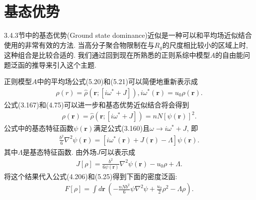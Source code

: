     \section{基态优势}
    3.4.3节中的基态优势(Ground state dominance)近似是一种可以和平均场近似结合使用的非常有效的方法.
    当高分子聚合物限制在与$R_{g}$的尺度相比较小的区域上时,
    这种组合是比较合适的.
    我们通过回到现在所熟悉的正则系综中模型$A$的自由能问题泛函的推导来引入这个主题.
    \par
    正则模型$A$中的平均场公式(5.20)和(5.21)可以简便地重新表示成
    \label{subsec.equations}
    \begin{equation}
        \begin{aligned}
        \rho(r)=\hat{\rho}(\bm{r};[i\omega^{*}+J]),
            i\omega^{*}(\bm{r})=u_{0}\rho(\bm{r}). 
                   \end{aligned}
        \label{eq5.51}
    \end{equation}
    公式(3.167)和(4.75)可以进一步和基态优势近似结合将会得到
    \label{subsec.equations}
    \begin{equation}
        \begin{aligned}
            \rho(\bm{r})=\hat{\rho}(\bm{r};[i\omega^{*}+J])=nN[\psi(\bm{r})]^{2}.
                   \end{aligned}
        \label{eq5.52}
    \end{equation}
    公式中的基态特征函数$\psi(\bm{r})$满足公式(3.160)且$\omega\longrightarrow
    i\omega^{*}+J$, 即
    \label{subsec.equations}
    \begin{equation}
        \begin{aligned}
            \frac{b^2}{6}\nabla^{2}\psi(\bm{r})=[i\omega^{*}(\bm{r})+J(\bm{r})-\Lambda]\psi(\bm{r}).
                   \end{aligned}
        \label{eq5.53}
    \end{equation}
其中$\Lambda$是基态特征函数. 由外场$J$可以表示成
    \label{subsec.equations}
    \begin{equation}
        \begin{aligned}
            J[\rho]=\frac{b^{2}}{6\psi(\bm{r})}\nabla^{2}\psi(\bm{r})-u_{0}\rho+\Lambda.
                   \end{aligned}
        \label{eq5.54}
    \end{equation}
将这个结果代入公式(4.206)和(5.25)得到下面的密度泛函:
    \label{subsec.equations}
    \begin{equation}
        \begin{aligned}
            F[\rho]=\int d\bm{r}\
            \left(-\frac{nNb^{2}}{6}\psi\nabla^{2}\psi+\frac{u_{0}}{2}\rho^{2}-\Lambda\rho
            \right).
                   \end{aligned}
        \label{eq5.55}
    \end{equation}

